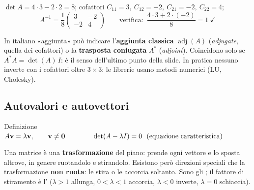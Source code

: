 \begin{esempio}[$A=\begin{pmatrix}4&2\\2&3\end{pmatrix}$, simmetrica come una covarianza]
$\det A=4\cdot3-2\cdot2=8$; cofattori $C_{11}=3,\ C_{12}=-2,\ C_{21}=-2,\ C_{22}=4$;
\[
A^{-1}=\frac18\begin{pmatrix}3&-2\\-2&4\end{pmatrix}
\qquad\text{verifica: }\ \frac{4\cdot3+2\cdot(-2)}{8}=1\ \checkmark
\]
\end{esempio}
\begin{attenzione}
In italiano «aggiunta» può indicare l'\textbf{aggiunta classica} $\operatorname{adj}(A)$ (\emph{adjugate}, quella dei cofattori) o la \textbf{trasposta coniugata} $A^*$ (\emph{adjoint}). Coincidono solo se $A^*A=\det(A)\,I$: è il senso dell'ultimo punto della slide. In pratica nessuno inverte con i cofattori oltre $3\times3$: le librerie usano metodi numerici (LU, Cholesky).
\end{attenzione}

\subsection{Autovalori e autovettori}
\begin{formulat}{Definizione}
$\displaystyle A\mathbf{v}=\lambda\mathbf{v},\qquad \mathbf{v}\neq\mathbf{0}\qquad\qquad \det(A-\lambda I)=0\ \ \text{(equazione caratteristica)}$
\end{formulat}
\begin{intuizione}
Una matrice è una \textbf{trasformazione} del piano: prende ogni vettore e lo sposta altrove, in genere ruotandolo e stirandolo. Esistono però direzioni speciali che la trasformazione \textbf{non ruota}: le stira o le accorcia soltanto. Sono gli ; il fattore di stiramento è l' ($\lambda>1$ allunga, $0<\lambda<1$ accorcia, $\lambda<0$ inverte, $\lambda=0$ schiaccia).
\end{intuizione}

